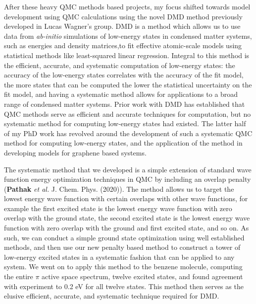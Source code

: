 \documentclass{article}
\begin{document}
After these heavy QMC methods based projects, my focus shifted towards model development using QMC calculations using the novel DMD method previously developed in Lucas Wagner's group.
DMD is a method which allows us to use data from \textit{ab-initio} simulations of low-energy states in condensed matter systems, such as energies and density matrices,to fit effective atomic-scale models using statistical methods like least-squared linear regression.
Integral to this method is the efficient, accurate, and systematic computation of low-energy states: the accuracy of the low-energy states correlates with the accuracy of the fit model,  the more states that can be computed the lower the statistical uncertainty on the fit model, and having a systematic method allows for applications to a broad range of condensed matter systems.
Prior work with DMD has established that QMC methods serve as efficient and accurate techniques for computation, but no systematic method for computing low-energy states had existed.
The latter half of my PhD work has revolved around the development of such a systematic QMC method for computing low-energy states, and the application of the method in developing models for graphene based systems.

The systematic method that we developed is a simple extension of standard wave function energy optimization techniques in QMC by including an overlap penalty (\textbf{Pathak} \textit{et al.} J. Chem. Phys. (2020)).
The method allows us to target the lowest energy wave function with certain overlaps with other wave functions, for example the first excited state is the lowest energy wave function with zero overlap with the ground state, the second excited state is the lowest energy wave function with zero overlap with the ground and first excited state, and so on.
As such, we can conduct a simple ground state optimization using well established methods, and then use our new penalty based method to construct a tower of low-energy excited states in a systematic fashion that can be applied to any system.
We went on to apply this method to the benzene molecule, computing the entire $\pi$ active space spectrum, twelve excited states, and found agreement with experiment to 0.2 eV for all twelve states.
This method then serves as the elusive efficient, accurate, and systematic technique required for DMD.
\end{document}
